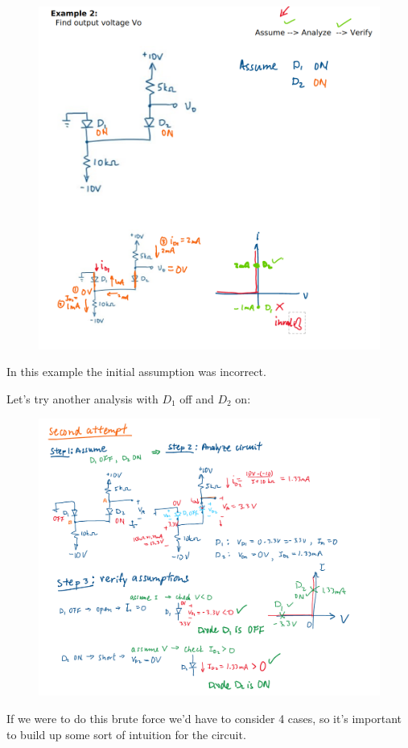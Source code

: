\documentclass[../notes.tex]{subfiles}
\begin{document}
\begin{figure}[H]
	\centering
	\includegraphics[width=0.8\linewidth]{img/image_2022-09-12-10-02-42.png}
\end{figure}

In this example the initial assumption was incorrect. 

Let's try another analysis with $ D_1  $ off and $ D_2 $ on:

\begin{figure}[H]
	\centering
	\includegraphics[width=0.8\linewidth]{img/image_2022-09-13-13-20-51.png}
\end{figure}

If we were to do this brute force we'd have to consider 4 cases, so it's important to build up some sort of intuition for the circuit.
\end{document}
